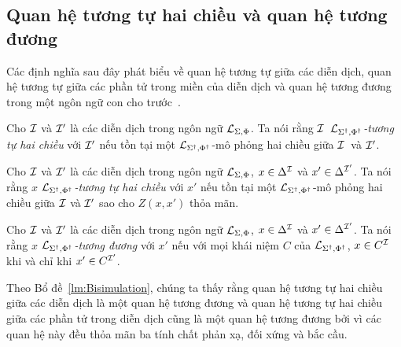\subsection{Quan hệ tương tự hai chiều và quan hệ tương đương}
\label{sec:Chap2.Bisimilary}

Các định nghĩa sau đây phát biểu về quan hệ tương tự giữa các diễn dịch, quan hệ tương tự giữa các phần tử trong miền của diễn dịch và quan hệ tương đương trong một ngôn ngữ con cho trước~\cite{ Divroodi2011B,Nguyen2013}.

\begin{Definition}
\label{def:InterpretationBisimilarity}
	Cho $\mathcal{I}$ và $\mathcal{I}'$ là các diễn dịch trong ngôn ngữ $\mathcal{L}_{\Sigma,\Phi}$. Ta nói rằng $\mathcal{I}$~{\em $\mathcal{L}_{\Sigma^\dag,\Phi^\dag}$-tương tự hai chiều} với $\mathcal{I}'$ nếu tồn tại một $\mathcal{L}_{\Sigma^\dag,\Phi^\dag}$-mô phỏng hai chiều giữa $\mathcal{I}$~và $\mathcal{I}'$.\myend
\end{Definition}

\begin{Definition}
\label{def:ElementBisimilarity}
	Cho $\mathcal{I}$ và $\mathcal{I}'$ là các diễn dịch trong ngôn ngữ $\mathcal{L}_{\Sigma,\Phi}$, $x \in \Delta^{\mathcal{I}}$ và $x' \in \Delta^{\mathcal{I}'}$. Ta nói rằng $x$ {\em $\mathcal{L}_{\Sigma^\dag,\Phi^\dag}$-tương tự hai chiều} với $x'$ nếu tồn tại một $\mathcal{L}_{\Sigma^\dag,\Phi^\dag}$-mô phỏng hai chiều giữa $\mathcal{I}$ và $\mathcal{I}'$ sao cho $Z(x,x')$ thỏa mãn.\myend	
\end{Definition}

\begin{Definition}
\label{def:LSPEquivalence}
	Cho $\mathcal{I}$ và $\mathcal{I}'$ là các diễn dịch trong ngôn ngữ $\mathcal{L}_{\Sigma,\Phi}$, $x \in \Delta^{\mathcal{I}}$ và $x' \in \Delta^{\mathcal{I}'}$. Ta nói rằng $x$ {\em $\mathcal{L}_{\Sigma^\dag,\Phi^\dag}$-tương đương} với $x'$ nếu với mọi khái niệm $C$ của $\mathcal{L}_{\Sigma^\dag,\Phi^\dag}$, $x \in C^{\mathcal{I}}$ khi và chỉ khi $x' \in C^{\mathcal{I}'}$.\myend
\end{Definition}

Theo Bổ đề~\ref{lm:Bisimulation}, chúng ta thấy rằng quan hệ tương tự hai chiều giữa các diễn dịch là một quan hệ tương đương và quan hệ tương tự hai chiều giữa các phần tử trong diễn dịch cũng là một quan hệ tương đương bởi vì các quan hệ này đều thỏa mãn ba tính chất phản xạ, đối xứng và bắc cầu.


